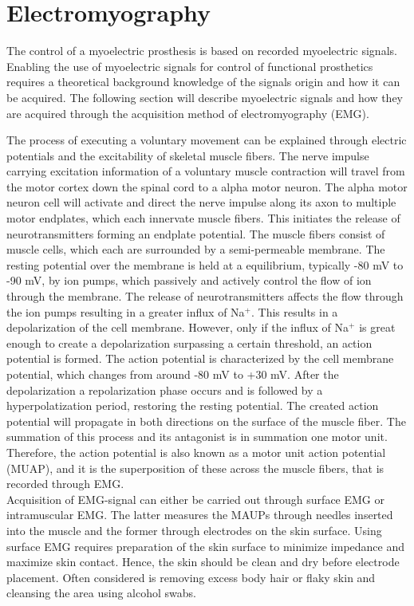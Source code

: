 \section{Electromyography}

The control of a myoelectric prosthesis is based on recorded myoelectric signals. \cite{Geethanjali2016}  Enabling the use of myoelectric signals for control of functional prosthetics requires a theoretical background knowledge of the signals origin and how it can be acquired. The following section will describe myoelectric signals and how they are acquired through the acquisition method of electromyography (EMG).      
 
The process of executing a voluntary movement can be explained through electric potentials and the excitability of skeletal muscle fibers. The nerve impulse carrying excitation information of a voluntary muscle contraction will travel from the motor cortex down the spinal cord to a alpha motor neuron. The alpha motor neuron cell will activate and direct the nerve impulse along its axon to multiple motor endplates, which each innervate muscle fibers. \cite{Turker2013} This initiates the release of neurotransmitters forming an endplate potential. The muscle fibers consist of muscle cells, which each are surrounded by a semi-permeable membrane. The resting potential over the membrane is held at a equilibrium, typically -80 mV to -90 mV, by ion pumps, which passively and actively control the flow of ion through the membrane. The release of neurotransmitters affects the flow through the ion pumps resulting in a greater influx of Na$^+$. This results in a depolarization of the cell membrane. However, only if the influx of Na$^+$ is great enough to create a depolarization surpassing a certain threshold, an action potential is formed. The action potential is characterized by the cell membrane potential, which changes from around -80 mV to +30 mV. After the depolarization a repolarization phase occurs and is followed by a hyperpolatization period, restoring the resting potential. The created action potential will propagate in both directions on the surface of the muscle fiber. The summation of this process and its antagonist is in summation one motor unit. Therefore, the action potential is also known as a motor unit action potential (MUAP), and it is the superposition of these across the muscle fibers, that is recorded through EMG. \cite{Turker2013,Martini2012} \\
Acquisition of EMG-signal can either be carried out through surface EMG or intramuscular EMG. The latter measures the MAUPs through needles inserted into the muscle and the former through electrodes on the skin surface. \cite{Cram2012} Using surface EMG requires preparation of the skin surface to minimize impedance and maximize skin contact. Hence, the skin should be clean and dry before electrode placement. Often considered is removing excess body hair or flaky skin and cleansing the area using alcohol swabs. \cite{Turker2013,Cram2012}  

